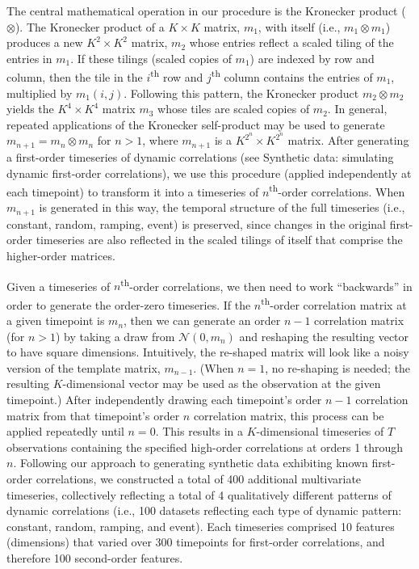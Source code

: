 \documentclass[english]{article}
\begin{document}
The central mathematical operation in our procedure is the Kronecker
product ($\otimes$).  The Kronecker product of a $K \times K$ matrix,
$m_1$, with itself (i.e., $m_1 \otimes m_1$) produces a new
$K^2 \times K^2$ matrix, $m_2$ whose entries reflect a scaled tiling
of the entries in $m_1$.  If these tilings (scaled copies of $m_1$) are
indexed by row and column, then the tile in the
$i$\textsuperscript{th} row and $j$\textsuperscript{th} column
contains the entries of $m_1$, multiplied by $m_1(i, j)$.  Following
this pattern, the Kronecker product $m_2 \otimes m_2$ yields the
$K^4 \times K^4$ matrix $m_3$ whose tiles are scaled copies of $m_2$.
In general, repeated applications of the Kronecker self-product may be
used to generate $m_{n+1} = m_n \otimes m_n$ for $n > 1$, where
$m_{n+1}$ is a $K^{2^n} \times K^{2^n}$ matrix.  After generating a
first-order timeseries of dynamic correlations (see Synthetic
  data: simulating dynamic first-order correlations), we use this
procedure (applied independently at each timepoint) to transform it
into a timeseries of $n$\textsuperscript{th}-order correlations.  When
$m_{n+1}$ is generated in this way, the temporal structure of the full
timeseries (i.e., constant, random, ramping, event) is preserved,
since changes in the original first-order timeseries are also
reflected in the scaled tilings of itself that comprise the
higher-order matrices.

Given a timeseries of $n$\textsuperscript{th}-order correlations, we
then need to work ``backwards'' in order to generate the order-zero
timeseries.  If the $n$\textsuperscript{th}-order correlation matrix
at a given timepoint is $m_n$, then we can generate an order $n-1$
correlation matrix (for $n > 1$) by taking a draw from
$\mathcal{N}\left(0, m_n\right)$ and reshaping the resulting vector to
have square dimensions.  Intuitively, the re-shaped matrix will look
like a noisy version of the template matrix, $m_{n-1}$.  (When
$n = 1$, no re-shaping is needed; the resulting $K$-dimensional vector
may be used as the observation at the given timepoint.)  After
independently drawing each timepoint's order $n-1$ correlation matrix
from that timepoint's order $n$ correlation matrix, this process can
be applied repeatedly until $n = 0$.  This results in a
$K$-dimensional timeseries of $T$ observations containing the
specified high-order correlations at orders 1 through $n$.  Following
our approach to generating synthetic data exhibiting known first-order
correlations, we constructed a total of 400 additional multivariate
timeseries, collectively reflecting a total of 4 qualitatively
different patterns of dynamic correlations (i.e., 100 datasets
reflecting each type of dynamic pattern: constant, random, ramping,
and event).  Each timeseries comprised 10 features (dimensions)
that varied over 300 timepoints for first-order correlations, and
therefore 100 second-order features. 
\end{document}
